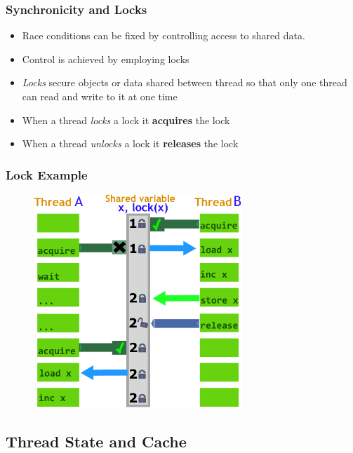 \documentclass{beamer}
\newcommand{\linespace}{\vskip 0.25cm}
\begin{document}
\begin{frame}
\frametitle{Synchronicity and Locks}

\begin{itemize}
	\item Race conditions can be fixed by controlling access to shared data.
	\item Control is achieved by employing locks
	
	\linespace
	
	\item \emph{Locks} secure objects or data shared between thread so that only one thread can read and write to it at one time

	\linespace

	\item When a thread \emph{locks} a lock it \textbf{acquires} the lock
	\item When a thread \emph{unlocks} a lock it \textbf{releases} the lock
\end{itemize}
\end{frame}

\begin{frame}
\frametitle{Lock Example}
	\begin{figure}
		\includegraphics[width=0.7\textwidth]{Illustrations/Lock}
		\label{fig:lock}
	\end{figure}
\end{frame}

\subsection[Cache]{Thread State and Cache}
\end{document}
